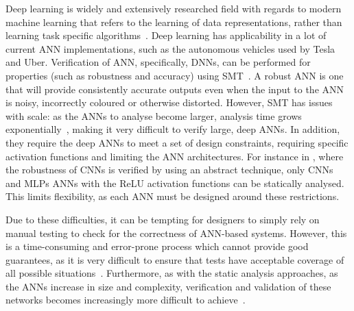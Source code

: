 Deep learning is widely and extensively researched field with regards to modern machine learning that refers to the learning of data representations, rather than learning task specific algorithms~\cite{schmidhuber2015deep}.
Deep learning has applicability in a lot of current \ac{ANN} implementations, such as the autonomous vehicles used by Tesla and Uber.
Verification of \ac{ANN}, specifically, \acfp{DNN}, can be performed for properties (such as robustness and accuracy) using \ac{SMT}~\cite{Gehr2018AI2SA,reluplex,DeepANNverify}. 
A robust \ac{ANN} is one that will provide consistently accurate outputs even when the input to the \ac{ANN} is noisy, incorrectly coloured or otherwise distorted. 
However, \ac{SMT} has issues with scale: as the \acp{ANN} to analyse become larger, analysis time grows exponentially~\cite{Gehr2018AI2SA},
making it very difficult to verify large, deep \acp{ANN}.
In addition, they require the deep \acp{ANN} to meet a set of design constraints, requiring specific activation functions and limiting the \ac{ANN} architectures.
For instance in \cite{Gehr2018AI2SA}, where the robustness of \acfp{CNN} is verified by using an abstract technique, only \acp{CNN} and \acp{MLP} \acp{ANN} with the \ac{ReLU} activation functions can be statically analysed.
This limits flexibility, as each \ac{ANN} must be designed around these restrictions. %

Due to these difficulties, it can be tempting for designers to simply rely on manual testing to check for the correctness of \ac{ANN}-based systems. 
However, this is a time-consuming and error-prone process which cannot provide good guarantees, as it is very difficult to ensure that tests have acceptable coverage of all possible situations~\cite{ANN-test}.
Furthermore, as with the static analysis approaches, as the \acp{ANN} increase in size and complexity, verification and validation of these networks becomes increasingly more difficult to achieve~\cite{Gehr2018AI2SA}.  


